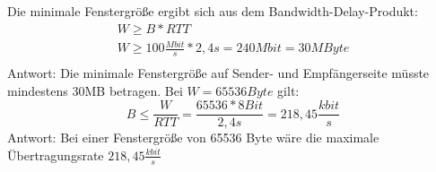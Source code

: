

Die minimale Fenstergröße ergibt sich aus dem Bandwidth-Delay-Produkt:
\begin{gather*}
    W \geq B * RTT\\
    W \geq 100 \frac{Mbit}{s} * 2,4s = 240 Mbit = 30MByte\\
\end{gather*}
Antwort: Die minimale Fenstergröße auf Sender- und Empfängerseite müsste mindestens 30MB betragen.
Bei $W = 65536 Byte$ gilt:
\[B \leq \frac{W}{RTT} = \frac{65536 * 8 Bit}{2,4s} = 218,45 \frac{kbit}{s}\]
Antwort: Bei einer Fenstergröße von 65536 Byte wäre die maximale Übertragungsrate $218,45 \frac{kbit}{s}$